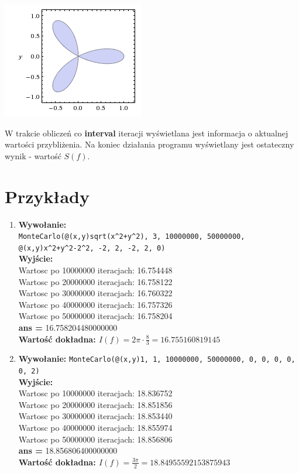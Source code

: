 \documentclass[]{article}
\begin{document}
\begin{itemize}
\begin{center}
	\includegraphics[scale = 0.75]{rose.png}
\end{center}	
	
\end{itemize}
W trakcie obliczeń co \textbf{interval} iteracji wyświetlana jest informacja o aktualnej wartości przybliżenia. Na koniec działania programu wyświetlany jest ostateczny wynik - wartość $S(f)$.
\section{Przykłady}
\begin{enumerate}
\item \textbf{Wywołanie:} \\
\verb|MonteCarlo(@(x,y)sqrt(x^2+y^2), 3, 10000000, 50000000, @(x,y)x^2+y^2-2^2, -2, 2, -2, 2, 0)|
\\\textbf{Wyjście:}
\\Wartosc po 10000000 iteracjach: 16.754448
\\Wartosc po 20000000 iteracjach: 16.758122
\\Wartosc po 30000000 iteracjach: 16.760322
\\Wartosc po 40000000 iteracjach: 16.757326
\\Wartosc po 50000000 iteracjach: 16.758204
\\\textbf{ans = } 16.758204480000000
\\\textbf{Wartość dokładna: $I(f) = 2\pi\cdot\frac{8}{3} = 16.755160819145$}

\item \textbf{Wywołanie:} \verb|MonteCarlo(@(x,y)1, 1, 10000000, 50000000, 0, 0, 0, 0, 0, 2)|
\\\textbf{Wyjście:}
\\Wartosc po 10000000 iteracjach: 18.836752
\\Wartosc po 20000000 iteracjach: 18.851856
\\Wartosc po 30000000 iteracjach: 18.853440
\\Wartosc po 40000000 iteracjach: 18.855974
\\Wartosc po 50000000 iteracjach: 18.856806
\\\textbf{ans = } 18.856806400000000
\\\textbf{Wartość dokładna: $I(f) = \frac{3\pi}{2} = 18.84955592153875943$}

\end{enumerate}
\end{document}
